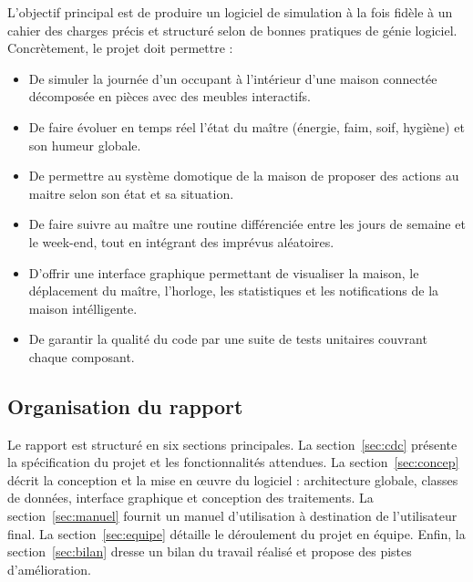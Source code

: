 L'objectif principal est de produire un logiciel de simulation à la fois fidèle à un cahier des charges précis et structuré selon de bonnes pratiques de génie logiciel. Concrètement, le projet doit permettre :
\begin{itemize}
\item De simuler la journée d'un occupant à l'intérieur d'une maison connectée décomposée en pièces avec des meubles interactifs.
\item De faire évoluer en temps réel l'état du maître (énergie, faim, soif, hygiène) et son humeur globale.
\item De permettre au système domotique de la maison de proposer des actions au maitre selon son état et sa situation.
\item De faire suivre au maître une routine différenciée entre les jours de semaine et le week-end, tout en intégrant des imprévus aléatoires.
\item D'offrir une interface graphique permettant de visualiser la maison, le déplacement du maître, l'horloge, les statistiques et les notifications de la maison intélligente.
\item De garantir la qualité du code par une suite de tests unitaires couvrant chaque composant.
\end{itemize}

\subsection{Organisation du rapport}

Le rapport est structuré en six sections principales. La section~\ref{sec:cdc} présente la spécification du projet et les fonctionnalités attendues. La section~\ref{sec:concep} décrit la conception et la mise en œuvre du logiciel : architecture globale, classes de données, interface graphique et conception des traitements. La section~\ref{sec:manuel} fournit un manuel d'utilisation à destination de l'utilisateur final. La section~\ref{sec:equipe} détaille le déroulement du projet en équipe. Enfin, la section~\ref{sec:bilan} dresse un bilan du travail réalisé et propose des pistes d'amélioration.
